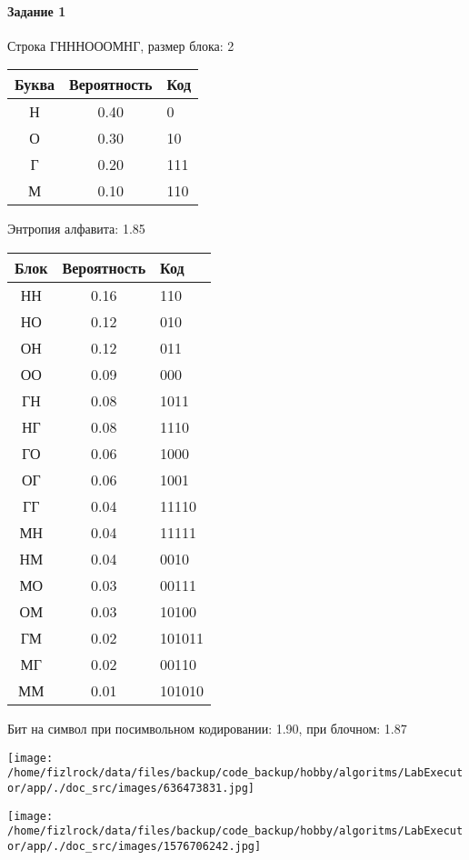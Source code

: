 \documentclass[a4paper, 12pt]{article}
\begin{document}
\paragraph{Задание 1}

Строка ГНННОООМНГ, размер блока: 2
\begin{center}
 \begin{tabular}{ |c|c|l| } 
  \hline
     Буква & Вероятность & Код\\ \hline
Н & 0.40 & 0\\\hline
О & 0.30 & 10\\\hline
Г & 0.20 & 111\\\hline
М & 0.10 & 110
\\ \hline \end{tabular}
\end{center}
Энтропия алфавита: 1.85
\begin{center}
 \begin{tabular}{ |c|c|l| } 
  \hline
     Блок & Вероятность & Код\\ \hline
НН & 0.16 & 110\\\hline
НО & 0.12 & 010\\\hline
ОН & 0.12 & 011\\\hline
ОО & 0.09 & 000\\\hline
ГН & 0.08 & 1011\\\hline
НГ & 0.08 & 1110\\\hline
ГО & 0.06 & 1000\\\hline
ОГ & 0.06 & 1001\\\hline
ГГ & 0.04 & 11110\\\hline
МН & 0.04 & 11111\\\hline
НМ & 0.04 & 0010\\\hline
МО & 0.03 & 00111\\\hline
ОМ & 0.03 & 10100\\\hline
ГМ & 0.02 & 101011\\\hline
МГ & 0.02 & 00110\\\hline
ММ & 0.01 & 101010
\\ \hline \end{tabular}
\end{center}
Бит на символ при посимвольном кодировании: 1.90, при блочном: 1.87

\texttt{[image: /home/fizlrock/data/files/backup/code\_backup/hobby/algoritms/LabExecutor/app/./doc\_src/images/636473831.jpg]}

\texttt{[image: /home/fizlrock/data/files/backup/code\_backup/hobby/algoritms/LabExecutor/app/./doc\_src/images/1576706242.jpg]}
\pagebreak
\end{document}
